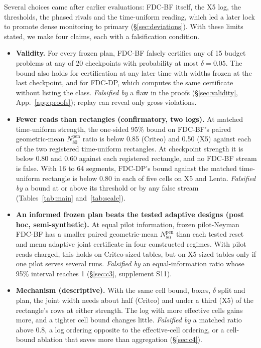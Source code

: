 \documentclass[sigconf,anonymous,review]{acmart}
\newcommand{\Npen}{N_{80}^{\text{pen}}}
\begin{document}
Several choices came after earlier evaluations: FDC-BF itself, the X5 log, the thresholds, the phased rivals and the time-uniform reading, which led a later lock to promote dense monitoring to primary (\S\ref{sec:deviations}). With these limits stated, we make four claims, each with a falsification condition.

\begin{itemize}
\item[\textbf{C1}] \textbf{Validity.} For every frozen plan, FDC-BF falsely certifies any of 15 budget problems at any of 20 checkpoints with probability at most $\delta = 0.05$. The bound also holds for certification at any later time with widths frozen at the last checkpoint, and for FDC-DP, which computes the same certificate without listing the class. \emph{Falsified by} a flaw in the proofs (\S\ref{sec:validity}, App.~\ref{app:proofs}); replay can reveal only gross violations.
\item[\textbf{C2}] \textbf{Fewer reads than rectangles (confirmatory, two logs).} At matched time-uniform strength, the one-sided 95\% bound on FDC-BF's paired geometric-mean $\Npen$ ratio is below 0.85 (Criteo) and 0.50 (X5) against each of the two registered time-uniform rectangles. At checkpoint strength it is below 0.80 and 0.60 against each registered rectangle, and no FDC-BF stream is false. With 16 to 64 segments, FDC-DP's bound against the matched time-uniform rectangle is below 0.80 in each of five cells on X5 and Lenta. \emph{Falsified by} a bound at or above its threshold or by any false stream (Tables~\ref{tab:main} and~\ref{tab:scale}).
\item[\textbf{C3}] \textbf{An informed frozen plan beats the tested adaptive designs (post hoc, semi-synthetic).} At equal pilot information, frozen pilot-Neyman FDC-BF has a smaller paired geometric-mean $\Npen$ than each tested reset and menu adaptive joint certificate in four constructed regimes. With pilot reads charged, this holds on Criteo-sized tables, but on X5-sized tables only if one pilot serves several runs. \emph{Falsified by} an equal-information ratio whose 95\% interval reaches 1 (\S\ref{sec:c3}, supplement S11).
\item[\textbf{C4}] \textbf{Mechanism (descriptive).} With the same cell bound, boxes, $\delta$ split and plan, the joint width needs about half (Criteo) and under a third (X5) of the rectangle's rows at either strength. The log with more effective cells gains more, and a tighter cell bound changes little. \emph{Falsified by} a matched ratio above 0.8, a log ordering opposite to the effective-cell ordering, or a cell-bound ablation that saves more than aggregation (\S\ref{sec:c4}).
\end{itemize}
\end{document}
